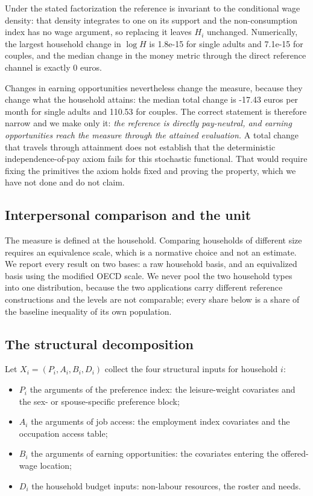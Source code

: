 Under the stated factorization the reference is invariant to the conditional wage density: that density integrates to one on its support and the non-consumption index has no wage argument, so replacing it leaves \(H_{i}\) unchanged. Numerically, the largest household change in \(\log H\) is 1.8e-15 for single adults and 7.1e-15 for couples, and the median change in the money metric through the direct reference channel is exactly 0 euros.

Changes in earning opportunities nevertheless change the measure, because they change what the household attains: the median total change is -17.43 euros per month for single adults and 110.53 for couples. The correct statement is therefore narrow and we make only it: \emph{the reference is directly pay-neutral, and earning opportunities reach the measure through the attained evaluation.} A total change that travels through attainment does not establish that the deterministic independence-of-pay axiom fails for this stochastic functional. That would require fixing the primitives the axiom holds fixed and proving the property, which we have not done and do not claim.

\subsection{Interpersonal comparison and the unit}\label{interpersonal-comparison-and-the-unit}

The measure is defined at the household. Comparing households of different size requires an equivalence scale, which is a normative choice and not an estimate. We report every result on two bases: a raw household basis, and an equivalized basis using the modified OECD scale. We never pool the two household types into one distribution, because the two applications carry different reference constructions and the levels are not comparable; every share below is a share of the baseline inequality of its own population.

\subsection{The structural decomposition}\label{the-structural-decomposition}

Let \(X_i=(P_i,A_i,B_i,D_i)\) collect the four structural inputs for household \(i\):

\begin{itemize}
\tightlist
\item
  \(P_i\) the arguments of the preference index: the leisure-weight covariates and the sex- or spouse-specific preference block;
\item
  \(A_i\) the arguments of job access: the employment index covariates and the occupation access table;
\item
  \(B_i\) the arguments of earning opportunities: the covariates entering the offered-wage location;
\item
  \(D_i\) the household budget inputs: non-labour resources, the roster and needs.
\end{itemize}

